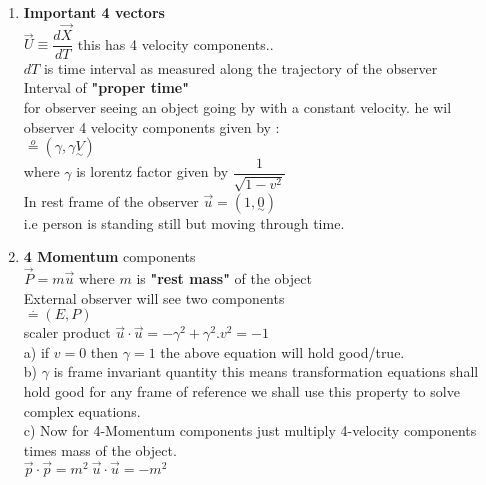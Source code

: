 \documentclass[11pt,a4paper]{article}
\begin{document}
\begin{enumerate}
\begin{enumerate}
\begin{enumerate}
                              \item \textbf{Important 4 vectors}\\
                                    $\vec{U}\equiv  \dfrac{d\vec{X}}{dT}$ this has 4 velocity components..\\
                                    $dT$ is time interval as measured along the trajectory of the observer \\
                                    Interval of \textbf{"proper time"}\\
                                    for observer seeing an object going by with a constant velocity. he wil observer 4 velocity components given by :\\
                                    $\mathop = \limits^{o}_{} (\gamma,\gamma \underset{\sim}{V})$\\
                                    where $\gamma$ is lorentz factor given by $\dfrac{1}{\sqrt{1-v^2}}$\\
                                    In rest frame of the observer $\vec{u} = (1,\underset{\sim}{0})$\\
                                    i.e person is standing still but moving through time.\\
                              \item \textbf{4 Momentum} components\\
                                    $\vec{P} = m \vec{u}$ where $m$ is \textbf{"rest mass"} of the object\\
                                    External observer will see two components\\
                                    $\mathop = \limits^{\cdot}_{} (E,P)$\\
                                    scaler product $\vec{u} \cdot \vec{u} = -\gamma^2 + \gamma^2.v^2 = -1$\\
                                    a) if $v=0$ then $\gamma=1$ the above equation will hold good/true.\\
                                    b) $\gamma$ is frame invariant quantity this means transformation equations shall hold good for any frame of reference we shall use this property to solve complex equations.\\
                                    c) Now for 4-Momentum components just multiply 4-velocity components times mass of the object.\\
                                    $\vec{p} \cdot \vec{p}=m^2\ \vec{u} \cdot \vec{u} = -m^2$\\

\end{enumerate}
\end{enumerate}
\end{enumerate}
\end{document}
